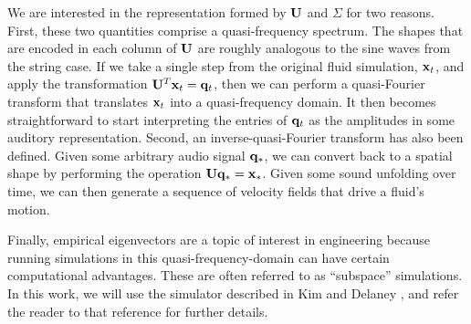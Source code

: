 \documentclass[11pt]{article}
\begin{document}


We are interested in the representation formed by $\mathbf{U}$ and $\Sigma$ for two reasons. First, these two quantities comprise a quasi-frequency spectrum. The shapes that are encoded in each column of $\mathbf{U}$ are roughly analogous to the sine waves from the string case. If we take a single step from the original fluid simulation, $\mathbf{x}_t$, and apply the transformation $\mathbf{U}^T\mathbf{x}_t = \mathbf{q}_t$, then we can perform a quasi-Fourier transform that translates $\mathbf{x}_t$ into a quasi-frequency domain. It then becomes straightforward to start interpreting the entries of $\mathbf{q}_t$ as the amplitudes in some auditory representation. Second, an inverse-quasi-Fourier transform has also been defined. Given some arbitrary audio signal $\mathbf{q}_*$, we can convert back to a spatial shape by performing the operation $\mathbf{U} \mathbf{q}_* = \mathbf{x}_*$. Given some sound unfolding over time, we can then generate a sequence of velocity fields that drive a fluid's motion.


Finally, empirical eigenvectors are a topic of interest in engineering because running simulations in this quasi-frequency-domain can have certain computational advantages. These are often referred to as ``subspace'' simulations. In this work, we will use the simulator described in Kim and Delaney \cite{Kim2013}, and refer the reader to that reference for further details.
\end{document}
